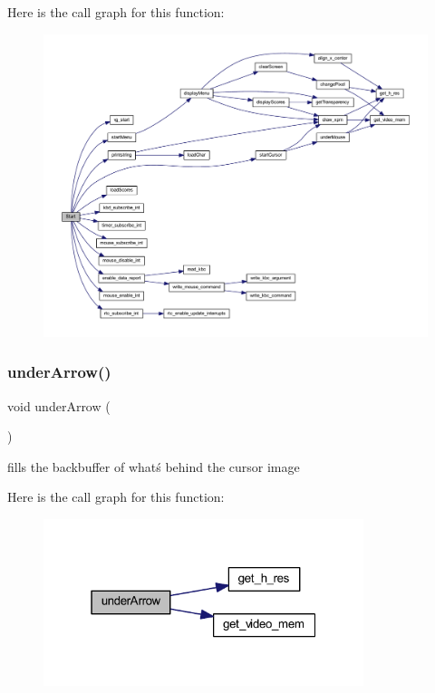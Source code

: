 Here is the call graph for this function\+:
\nopagebreak
\begin{figure}[H]
\begin{center}
\leavevmode
\includegraphics[width=350pt]{group__game_gaaae55be55be73d9c3073893b52530b32_cgraph}
\end{center}
\end{figure}
\mbox{\label{group__game_gaa6f544d0a9fe4df07759118388d9ec22}} 
\subsubsection{\texorpdfstring{underArrow()}{underArrow()}}
{\footnotesize\ttfamily void under\+Arrow (\begin{DoxyParamCaption}{ }\end{DoxyParamCaption})}



fills the backbuffer of whatś behind the cursor image 

Here is the call graph for this function\+:
\nopagebreak
\begin{figure}[H]
\begin{center}
\leavevmode
\includegraphics[width=265pt]{group__game_gaa6f544d0a9fe4df07759118388d9ec22_cgraph}
\end{center}
\end{figure}
\mbox{\label{group__game_ga192a0a30e5705be3b2800eb7172aa6d4}} 
